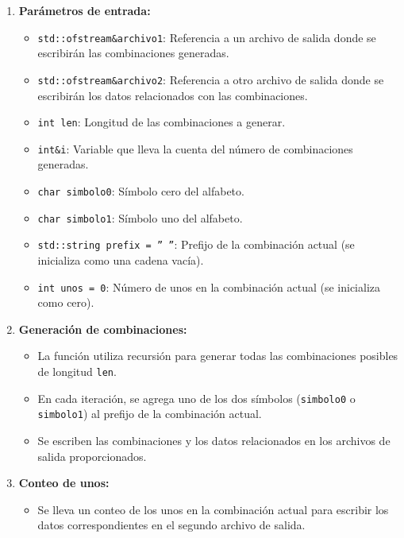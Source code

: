 \documentclass{article}
\begin{document}
        \begin{enumerate}
            \item \textbf{Parámetros de entrada:}
                \begin{itemize}
                    \item \texttt{std::ofstream\&archivo1}: Referencia a un archivo de salida donde se escribirán las combinaciones
                    generadas.
                    \item \texttt{std::ofstream\&archivo2}: Referencia a otro archivo de salida donde se escribirán los datos
                    relacionados con las combinaciones.
                    \item \texttt{int len}: Longitud de las combinaciones a generar.
                    \item \texttt{int\&i}: Variable que lleva la cuenta del número de combinaciones generadas.
                    \item \texttt{char simbolo0}: Símbolo cero del alfabeto.
                    \item \texttt{char simbolo1}: Símbolo uno del alfabeto.
                    \item \texttt{std::string prefix = '' ''}: Prefijo de la combinación actual (se inicializa como una cadena vacía).
                    \item \texttt{int unos = 0}: Número de unos en la combinación actual (se inicializa como cero).
                \end{itemize}

            \item \textbf{Generación de combinaciones:}
                \begin{itemize}
                    \item La función utiliza recursión para generar todas las combinaciones posibles de longitud \texttt{len}.
                    \item En cada iteración, se agrega uno de los dos símbolos (\texttt{simbolo0} o \texttt{simbolo1}) al prefijo de
                    la combinación actual.
                    \item Se escriben las combinaciones y los datos relacionados en los archivos de salida proporcionados.
                \end{itemize}

            \item \textbf{Conteo de unos:}
                \begin{itemize}
                    \item Se lleva un conteo de los unos en la combinación actual para escribir los datos correspondientes en el
                    segundo archivo de salida.
                \end{itemize}
        \end{enumerate}
\end{document}
